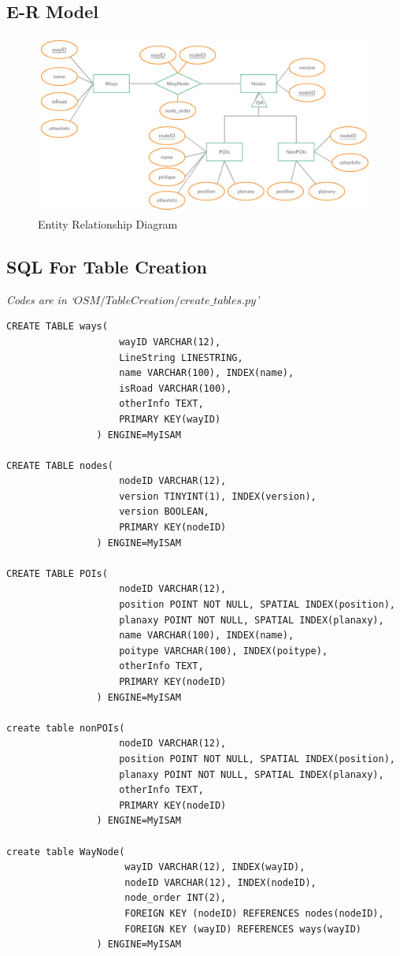 \documentclass[final,1p,times]{elsarticle}
\begin{document}
\subsection{E-R Model}
\begin{figure}[thpb]
      \centering
      \includegraphics[width=14cm]{ER.pdf}
      \caption{Entity Relationship Diagram}
      \label{fig:ER}
\end{figure}

\subsection{SQL For Table Creation}
\emph{Codes are in `$OSM/TableCreation/create\_tables.py$'}
\begin{verbatim}
CREATE TABLE ways(
          			wayID VARCHAR(12),
                    LineString LINESTRING,
                    name VARCHAR(100), INDEX(name),
                    isRoad VARCHAR(100),
                    otherInfo TEXT,
                    PRIMARY KEY(wayID)
                ) ENGINE=MyISAM
                
CREATE TABLE nodes(
                    nodeID VARCHAR(12),
                    version TINYINT(1), INDEX(version),
                    version BOOLEAN,
                    PRIMARY KEY(nodeID)
                ) ENGINE=MyISAM
                
CREATE TABLE POIs(
                    nodeID VARCHAR(12),
                    position POINT NOT NULL, SPATIAL INDEX(position),
                    planaxy POINT NOT NULL, SPATIAL INDEX(planaxy),
                    name VARCHAR(100), INDEX(name),
                    poitype VARCHAR(100), INDEX(poitype),
                    otherInfo TEXT,
                    PRIMARY KEY(nodeID)
                ) ENGINE=MyISAM
                
create table nonPOIs(
                    nodeID VARCHAR(12),
                    position POINT NOT NULL, SPATIAL INDEX(position),
                    planaxy POINT NOT NULL, SPATIAL INDEX(planaxy),
                    otherInfo TEXT,
                    PRIMARY KEY(nodeID)
                ) ENGINE=MyISAM
                
create table WayNode(
                     wayID VARCHAR(12), INDEX(wayID),
                     nodeID VARCHAR(12), INDEX(nodeID),
                     node_order INT(2),
                     FOREIGN KEY (nodeID) REFERENCES nodes(nodeID),
                     FOREIGN KEY (wayID) REFERENCES ways(wayID)
                ) ENGINE=MyISAM                
\end{verbatim}
\end{document}
